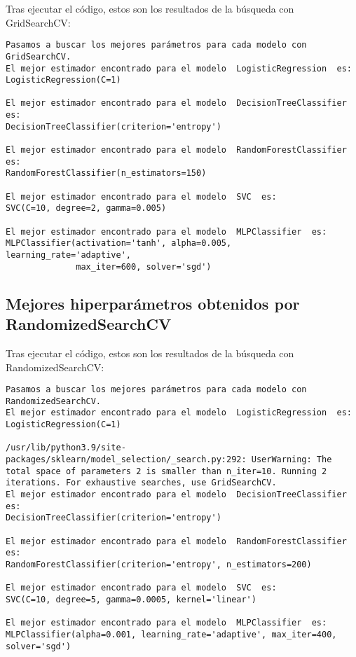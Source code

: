 Tras ejecutar el código, estos son los resultados de la búsqueda con GridSearchCV:

\begin{lstlisting}
Pasamos a buscar los mejores parámetros para cada modelo con GridSearchCV.
El mejor estimador encontrado para el modelo  LogisticRegression  es:
LogisticRegression(C=1)

El mejor estimador encontrado para el modelo  DecisionTreeClassifier  es:
DecisionTreeClassifier(criterion='entropy')

El mejor estimador encontrado para el modelo  RandomForestClassifier  es:
RandomForestClassifier(n_estimators=150)

El mejor estimador encontrado para el modelo  SVC  es:
SVC(C=10, degree=2, gamma=0.005)

El mejor estimador encontrado para el modelo  MLPClassifier  es:
MLPClassifier(activation='tanh', alpha=0.005, learning_rate='adaptive',
              max_iter=600, solver='sgd')
\end{lstlisting}

\subsection{Mejores hiperparámetros obtenidos por RandomizedSearchCV}

Tras ejecutar el código, estos son los resultados de la búsqueda con RandomizedSearchCV:

\begin{lstlisting}
Pasamos a buscar los mejores parámetros para cada modelo con RandomizedSearchCV.
El mejor estimador encontrado para el modelo  LogisticRegression  es:
LogisticRegression(C=1)

/usr/lib/python3.9/site-packages/sklearn/model_selection/_search.py:292: UserWarning: The total space of parameters 2 is smaller than n_iter=10. Running 2 iterations. For exhaustive searches, use GridSearchCV.
El mejor estimador encontrado para el modelo  DecisionTreeClassifier  es:
DecisionTreeClassifier(criterion='entropy')

El mejor estimador encontrado para el modelo  RandomForestClassifier  es:
RandomForestClassifier(criterion='entropy', n_estimators=200)

El mejor estimador encontrado para el modelo  SVC  es:
SVC(C=10, degree=5, gamma=0.0005, kernel='linear')

El mejor estimador encontrado para el modelo  MLPClassifier  es:
MLPClassifier(alpha=0.001, learning_rate='adaptive', max_iter=400, solver='sgd')
\end{lstlisting}

